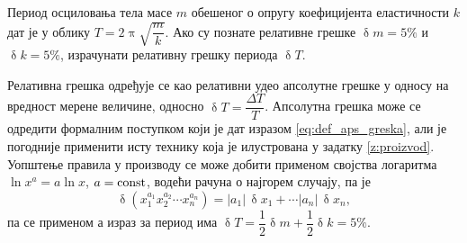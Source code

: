 \PID Период осциловања тела масе $m$ обешеног о опругу коефицијента еластичности $k$ 
дат је у облику 
$T = 2\uppi\sqrt{\dfrac{m}{k}}$. Ако су познате релативне грешке  
$\updelta m = 5\%$ и $\updelta k = 5\%$, израчунати релативну грешку 
периода $\updelta T$. 

\RESENJE 

Релативна грешка одређује се као релативни удео апсолутне грешке у односу на вредност мерене величине, односно 
$\updelta T = \dfrac{\Delta T}{T}$. Апсолутна грешка може се одредити формалним поступком који је дат изразом
\eqref{eq:def_aps_greska}, али је погодније применити исту технику која је илустрована у задатку 
\ref{z:proizvod}. Уопштење правила у производу се може добити применом својства логаритма
$\ln x^a = a\ln x$, $a = \rm const$, водећи рачуна о најгорем случају, па је 
\begin{equation}
    \updelta(x_1^{a_1}x_2^{a_2}\cdots x_n^{a_n})
    = |a_1| \, \updelta x_1 + \cdots |a_n| \, \updelta x_n,
\end{equation}
па се применом а израз за период има $\updelta T = \dfrac{1}{2} \updelta m + \dfrac{1}{2} \updelta k = 5\%$.